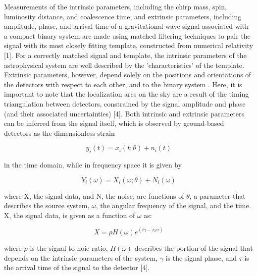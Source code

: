 \documentclass{article}
\begin{document}
Measurements of the intrinsic parameters, including the chirp mass, spin, luminosity distance, and coalescence time, and extrinsic parameters, including amplitude, phase, and arrival time of a gravitational wave signal associated with a compact binary system are made using matched filtering techniques to pair the signal with its most closely fitting template, constructed from numerical relativity [1].  For a correctly matched signal and template, the intrinsic parameters of the astrophysical system are well described by the 'characteristics' of the template.  Extrinsic parameters, however, depend solely on the positions and orientations of the detectors with respect to each other, and to the binary system .  Here, it is important to note that the localization arcs on the sky are a result of the timing triangulation between detectors, constrained by the signal amplitude and phase (and their associated uncertainties) [4].  Both intrinsic and extrinsic parameters can be inferred from the signal itself, which is observed by ground-based detectors as the dimensionless strain

\begin{equation}    y_i(t) = x_i(t;\theta) + n_i(t) \end{equation}

in the time domain, while in frequency space it is given by 

\begin{equation} Y_i(\omega) = X_i(\omega; \theta) + N_i(\omega) \end{equation}

where X, the signal data, and N, the noise, are functions of $\theta$, a parameter that describes the source system, $\omega$, the angular frequency of the signal, and the time. X, the signal data, is given as a function of $\omega$ as:

\begin{equation} X = \rho H(\omega)e^{(i\gamma - i\omega\tau)} \end{equation}

where $\rho$ is the signal-to-noie ratio, $H(\omega)$ describes the portion of the signal that depends on the intrinsic parameters of the system, $\gamma$ is the signal phase, and $\tau$ is the arrival time of the signal to the detector [4].
\end{document}
